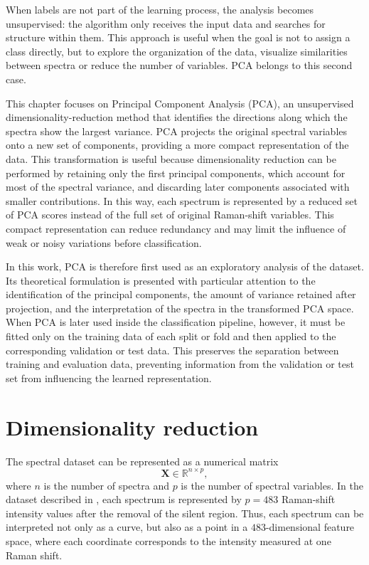When labels are not part of the learning process, the analysis becomes unsupervised: the algorithm only receives the input data and searches for structure within them. This approach is useful when the goal is not to assign a class directly, but to explore the organization of the data, visualize similarities between spectra or reduce the number of variables. PCA belongs to this second case. 

This chapter focuses on Principal Component Analysis (PCA), an unsupervised 
dimensionality-reduction method that identifies the directions along which the spectra show the largest variance. PCA projects the original spectral variables onto a new set of components, providing a more compact representation of the data. This transformation is useful because dimensionality reduction can be performed by retaining only the first principal components, which account for most of the spectral variance, and discarding later components associated with smaller contributions. In this way, each spectrum is represented by a reduced set of PCA scores instead of the full set of original Raman-shift variables. This compact representation can reduce redundancy and may limit the influence of weak or noisy variations before classification.

In this work, PCA is therefore first used as an
exploratory analysis of the dataset. Its theoretical formulation is presented with particular attention to the identification of the principal components, the amount of variance retained after projection, and the interpretation of the spectra in the transformed PCA space. When PCA is later used inside the classification pipeline, however, it must be fitted only on the training data of each split or fold and then applied to the corresponding validation or test data. This preserves the separation between training and evaluation data, preventing information from the validation or test set from influencing the learned representation.

\section{Dimensionality reduction}
\label{sec:dimensionality_reduction}

The spectral dataset can be represented as a numerical matrix
\begin{equation}
    \mathbf{X} \in \mathbb{R}^{n \times p},
    \label{eq:pca_data_matrix}
\end{equation}
where \(n\) is the number of spectra and \(p\) is the number of spectral variables. In the
dataset described in , each spectrum is represented by \(p = 483\)
Raman-shift intensity values after the removal of the silent region. Thus, each spectrum
can be interpreted not only as a curve, but also as a point in a \(483\)-dimensional
feature space, where each coordinate corresponds to the intensity measured at one Raman
shift.


